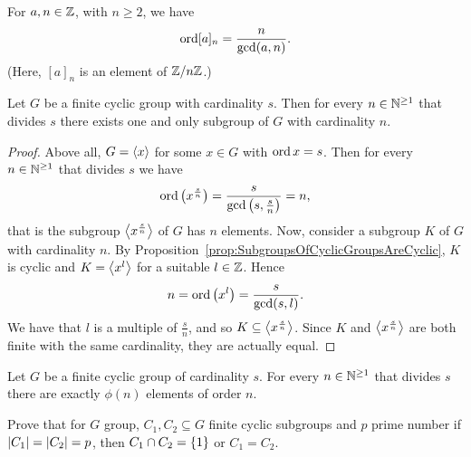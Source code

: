 \begin{corollary}
For \(a, n \in \mathbb Z\), with \(n \ge 2\), we have
\[\operatorname{ord} [a]_n = \frac{n}{\gcd(a, n)}.\]
(Here, \([a]_n\) is an element of \(\mathbb Z/n\mathbb Z\).)
\end{corollary}

\begin{proposition}\label{prop:CyclicOneAndOnlySubgroup}
Let \(G\) be a finite cyclic group with cardinality \(s\). Then for every \(n \in \mathbb N^{\ge 1}\) that divides \(s\) there exists one and only subgroup of \(G\) with cardinality \(n\).
\end{proposition}

\begin{proof}
Above all, \(G = \left\langle x\right\rangle\) for some \(x \in G\) with \(\operatorname{ord} x = s\). Then for every \(n \in \mathbb N^{\ge 1}\) that divides \(s\) we have
\[\operatorname{ord}\left(x^{\frac s n}\right) = \frac{s}{\gcd\left(s, \frac s n\right)} = n,\]
that is the subgroup \(\left\langle x^{\frac s n}\right\rangle\) of \(G\) has \(n\) elements. Now, consider a subgroup \(K\) of \(G\) with cardinality \(n\). By Proposition~\ref{prop:SubgroupsOfCyclicGroupsAreCyclic}, \(K\) is cyclic and \(K = \left\langle x^l\right\rangle\) for a suitable \(l \in \mathbb Z\). Hence
\[n = \operatorname{ord}{\left(x^l\right)} = \frac{s}{\gcd(s, l)}.\]
We have that \(l\) is a multiple of \(\frac s n\), and so \(K \subseteq \left\langle x^{\frac s n}\right\rangle\). Since \(K\) and \(\left\langle x^{\frac s n}\right\rangle\) are both finite with the same cardinality, they are actually equal.
\end{proof}

\begin{corollary}\label{cor:CyclicGroupsHavePhiNElemsOfOrdN}
Let \(G\) be a finite cyclic group of cardinality \(s\). For every \(n \in \mathbb N^{\ge 1}\) that divides \(s\) there are exactly \(\phi(n)\) elements of order \(n\).
\end{corollary}

\begin{exercise}
Prove that for \(G\) group, \(C_1, C_2 \subseteq G\) finite cyclic subgroups and \(p\) prime number if \(\left\lvert C_1\right\rvert = \left\lvert C_2\right\rvert = p\), then \(C_1 \cap C_2 = \left\{1\right\}\) or \(C_1 = C_2\).
\end{exercise}

